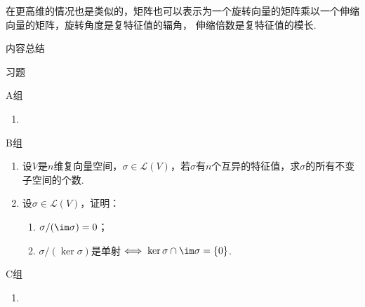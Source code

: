 在更高维的情况也是类似的，矩阵也可以表示为一个旋转向量的矩阵乘以一个伸缩向量的矩阵，旋转角度是复特征值的辐角，
伸缩倍数是复特征值的模长.

\vspace{2ex}
\centerline{\heiti \Large 内容总结}

\vspace{2ex}

\centerline{\heiti \Large 习题}
\vspace{2ex}
{\kaishu }
\begin{flushright}
    \kaishu

\end{flushright}
\centerline{\heiti A组}
\begin{enumerate}
    \item
\end{enumerate}
\centerline{\heiti B组}
\begin{enumerate}
    \item 设$V$是$n$维复向量空间，$\sigma\in \mathcal{L}(V)$，若$\sigma$有$n$个互异的特征值，求$\sigma$的所有不变子空间的个数.
    \item 设$\sigma\in \mathcal{L}(V)$，证明：
    \begin{enumerate}[label=(\arabic*)]
        \item $\sigma/(\im \sigma)=0$；

        \item $\sigma/(\ker \sigma)$是单射$\iff \ker \sigma\cap\im \sigma=\{0\}$.
    \end{enumerate}
\end{enumerate}
\centerline{\heiti C组}
\begin{enumerate}
    \item
\end{enumerate}
